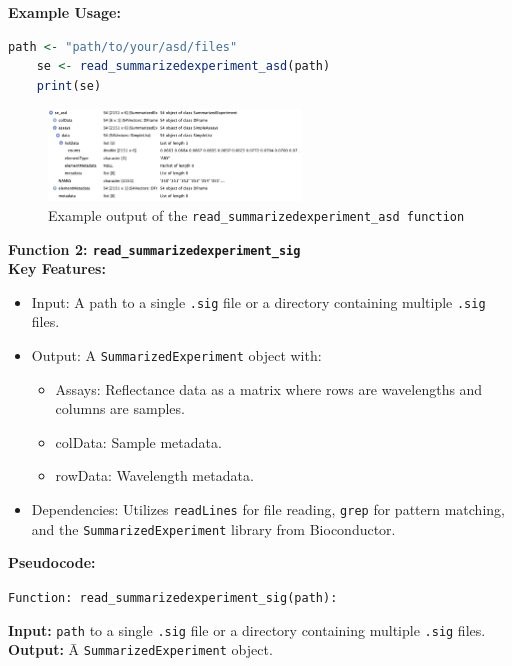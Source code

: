 \documentclass[12pt,a4paper]{report}
\begin{document}
\textbf{Example Usage:}

\begin{lstlisting}[language=R, style=mystyle]
    path <- "path/to/your/asd/files"
    se <- read_summarizedexperiment_asd(path)
    print(se)
    \end{lstlisting}

\begin{figure}[h]
    \centering
    \includegraphics[width=0.6\textwidth]{Figures/se_asd_1.png}
    \caption{Example output of the \texttt{read\_summarizedexperiment\_asd function}}
    \label{Figure 2}
\end{figure}

\textbf{Function 2: \texttt{read\_summarizedexperiment\_sig}} \\

\textbf{Key Features:}
\begin{itemize}
    \item Input: A path to a single \texttt{.sig} file or a directory containing multiple \texttt{.sig} files.
    \item Output: A \texttt{SummarizedExperiment} object with:
    \begin{itemize}
        \item Assays: Reflectance data as a matrix where rows are wavelengths and columns are samples.
        \item colData: Sample metadata.
        \item rowData: Wavelength metadata.
    \end{itemize}
    \item Dependencies: Utilizes \texttt{readLines} for file reading, \texttt{grep} for pattern matching, and the \texttt{SummarizedExperiment} library from Bioconductor.
\end{itemize}

\textbf{Pseudocode:}

\texttt{Function: read\_summarizedexperiment\_sig(path):} \\

\begin{tabbing}
\hspace*{2em} \textbf{Input:} \= \texttt{path} to a single \texttt{.sig} file or a directory containing multiple \texttt{.sig} files. \\
\hspace*{2em} \textbf{Output:} \= A \texttt{SummarizedExperiment} object. \\
\end{tabbing}
\end{document}
